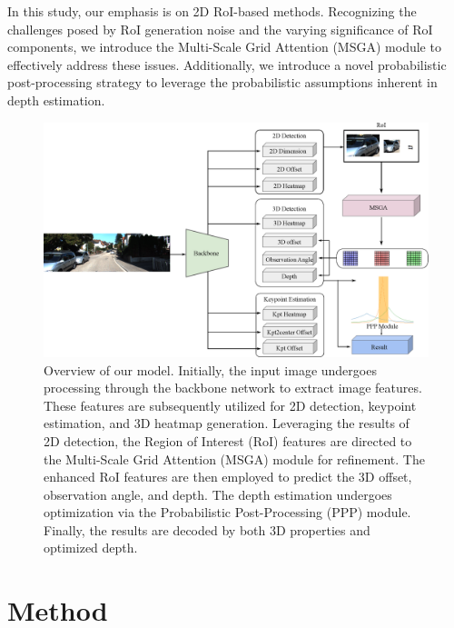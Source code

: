 \documentclass[journal]{IEEEtran}
\begin{document}
	In this study, our emphasis is on 2D RoI-based methods. Recognizing the challenges posed by RoI generation noise and the varying significance of RoI components, we introduce the Multi-Scale Grid Attention (MSGA) module to effectively address these issues. Additionally, we introduce a novel probabilistic post-processing strategy to leverage the probabilistic assumptions inherent in depth estimation.
	\begin{figure}[!t]
	\centering
	\includegraphics[width=1.0\linewidth]{Figures/overview/overview.eps}
	\caption{Overview of our model. Initially, the input image undergoes processing through the backbone network to extract image features. These features are subsequently utilized for 2D detection, keypoint estimation, and 3D heatmap generation. Leveraging the results of 2D detection, the Region of Interest (RoI) features are directed to the Multi-Scale Grid Attention (MSGA) module for refinement. The enhanced RoI features are then employed to predict the 3D offset, observation angle, and depth. The depth estimation undergoes optimization via the Probabilistic Post-Processing (PPP) module. Finally, the results are decoded by both 3D properties and optimized depth.}
	\label{fig:overview}
\end{figure}
	
	\section{Method}\label{sec:method}
\end{document}
